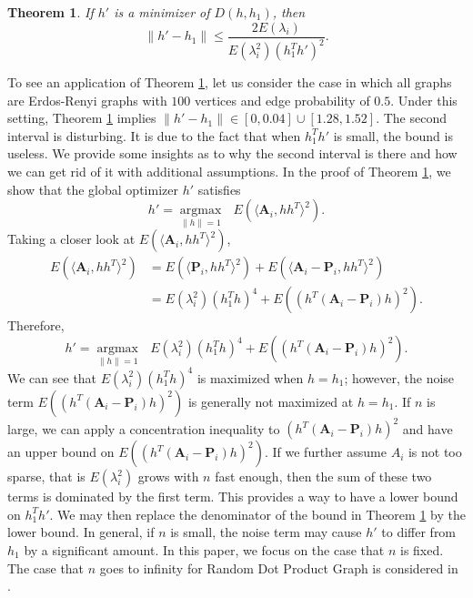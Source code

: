 \documentclass[10pt,journal,compsoc]{IEEEtran}
\newtheorem{theorem}{Theorem}[section]
\newcommand{\bA}{\mathbf{A}}
\newcommand{\bP}{\mathbf{P}}
\begin{document}
\begin{theorem}
\label{thm:2}
If $h'$ is a minimizer of $D(h,h_1)$, then 
\[\|h'-h_1\| \leq \frac{2 E(\lambda_i)}{E(\lambda_i^2)(h_1^T h')^2}. \]
\end{theorem}

\noindent	To see an application of Theorem \ref{thm:2}, let us consider the case in which all graphs are Erdos-Renyi graphs with $100$ vertices and edge probability of $0.5$. Under this setting, Theorem \ref{thm:2} implies  $\|h'-h_1\| \in [0,0.04] \cup [1.28,1.52]$. The second interval is disturbing. It is due to the fact that when $h_1^T h'$ is small, the bound is useless. We provide some insights as to why the second interval is there and how we can get rid of it with additional assumptions. In the proof of Theorem \ref{thm:2}, we show that the global optimizer $h'$ satisfies
\[h'= \underset{\|h\| =1}{\operatorname{argmax}} \text{ } E(\langle \bA_i,h h^T \rangle ^2). \]
Taking a closer look at $E(\langle \bA_i,h h^T \rangle ^2)$,
\begin{align*}
	E(\langle \bA_i,h h^T \rangle ^2) &= E(\langle \bP_i,h h^T \rangle ^2)+E(\langle \bA_i-\bP_i,h h^T \rangle ^2) \\
	&=E(\lambda_i^2)(h_1^T h)^4+E((h^T (\bA_i-\bP_i)h) ^2).
\end{align*}
Therefore, 
\[h'= \underset{\|h\| =1}{\operatorname{argmax}} \text{ } E(\lambda_i^2)(h_1^T h)^4+E((h^T (\bA_i-\bP_i)h) ^2) .\]
We can see that $E(\lambda_i^2)(h_1^T h)^4$ is maximized when $h=h_1$; however, the noise term $E((h^T (\bA_i-\bP_i)h) ^2)$ is generally not maximized at $h=h_1$. If $n$ is large, we can apply a concentration inequality to $(h^T (\bA_i-\bP_i)h) ^2$ and have an upper bound on $E((h^T (\bA_i-\bP_i)h) ^2)$. If we further assume $A_i$ is not too sparse, that is $E(\lambda_i^2)$ grows with $n$ fast enough, then the sum of these two terms is dominated by the first term. This provides a way to have a lower bound on $h_1^T h'$. We may then replace the denominator of the bound in Theorem \ref{thm:2} by the lower bound. In general, if $n$ is small, the noise term may cause $h'$ to differ from $h_1$ by a significant amount. In this paper, we focus on the case that $n$ is fixed. The case that $n$ goes to infinity for Random Dot Product Graph is considered in \cite{athreya2013limit}.\\
\end{document}
